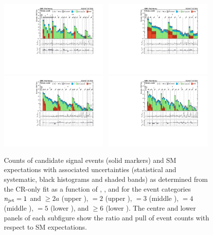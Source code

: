 \begin{figure}[!h]
  \centering
  \caption{Counts of candidate signal events (solid markers) and SM
    expectations with associated uncertainties (statistical and
    systematic, black histograms and shaded bands) as determined from
    the CR-only fit as a function of \nb, \scalht, and \mht for the
    event categories $n_{\text{jet}} = 1$ and ${\geq}2a$ (upper \cmsLeft), $=2$
    (upper \cmsRight), $=3$ (middle \cmsLeft), $=4$ (middle
    \cmsRight), $=5$ (lower \cmsLeft), and ${\geq}6$ (lower
    \cmsRight). The centre and lower panels of each subfigure show the
    ratio and pull of event counts with respect to SM expectations.}
  \includegraphics[width=0.48\textwidth, trim=10 0 60 10, clip=true]{Figures/1jet_cr-only.pdf}~ 
  \includegraphics[width=0.48\textwidth, trim=10 0 60 10, clip=true]{Figures/2jet_cr-only.pdf}\\
  \includegraphics[width=0.48\textwidth, trim=10 0 60 10, clip=true]{Figures/3jet_cr-only.pdf}~
  \includegraphics[width=0.48\textwidth, trim=10 0 60 10, clip=true]{Figures/4jet_cr-only.pdf}\\

\end{figure}
